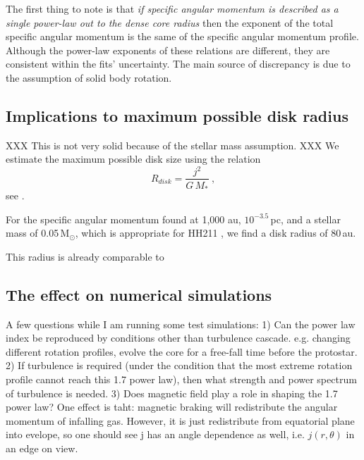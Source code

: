 The first thing to note is that \emph{if specific angular momentum is described as a single power-law out to the dense core radius} 
then the exponent of the total specific angular momentum is the same of the 
specific angular momentum profile. 
%
Although the power-law exponents of these relations are different, they are 
consistent within the fits' uncertainty. 
The main source of discrepancy is due to the assumption of solid body rotation.

\subsection{Implications to maximum possible disk radius}
XXX This is not very solid because of the stellar mass assumption. XXX
We estimate the maximum possible disk size using the relation
\begin{equation}
R_{disk} = \frac{j^2}{G\,M_*}~,
\end{equation}
see \cite{Yen_2015}.

For the specific angular momentum found at 1,000 au, $10^{-3.5}$\,\kms pc, and a stellar mass 
of 0.05\,M$_\odot$, which is appropriate for HH211 \citep{Lee_2009,Froebrich_2003},  
we find a disk radius of 80\,au.

This radius is already comparable to 

\subsection{The effect on numerical simulations}
A few questions while I am running some test simulations:
1) Can the power law index be reproduced by conditions other than turbulence cascade.
  e.g. changing different rotation profiles, evolve the core for a free-fall time before the protostar. 
2) If turbulence is required (under the condition that the most extreme rotation profile cannot reach this 1.7 power law), then what strength and power spectrum of turbulence is needed.
3) Does magnetic field play a role in shaping the 1.7 power law?
  One effect is taht: magnetic braking will redistribute the angular momentum of infalling gas.
  However, it is just redistribute from equatorial plane into evelope, so one should see j has an angle dependence as well, i.e. $j(r,\theta)$ in an edge on view.

  

  
  
